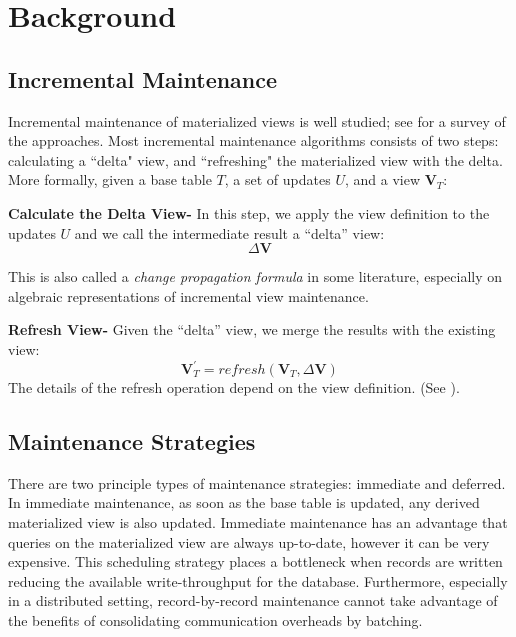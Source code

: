 \section{Background}\label{sec-background}

\subsection{Incremental Maintenance}
Incremental maintenance of materialized views is well studied; see \cite{chirkova2011materialized} for a survey of the approaches. 
Most incremental maintenance algorithms consists of two steps: calculating a ``delta" view,
and ``refreshing" the materialized view with the delta.
More formally, given a base table $T$, a set of updates $U$,
and a view $\textbf{V}_{T}$:

\textbf{Calculate the Delta View- }
In this step, we apply the view definition to the updates $U$ and we call
the intermediate result a ``delta'' view:
\[
\Delta\textbf{V}
\]

This is also called a \emph{change propagation formula} in some literature, 
especially on algebraic representations of incremental view maintenance.

\textbf{Refresh View- }
Given the ``delta'' view, we merge the results with the existing
view:
\[
\textbf{V}_{T}^{'}=refresh(\textbf{V}_{T},\Delta\textbf{V})
\] 
The details of the refresh operation depend on the view definition.
(See \cite{chirkova2011materialized}).


\subsection{Maintenance Strategies}
There are two principle types of maintenance strategies: immediate and deferred. 
In immediate maintenance, as soon as the base table is updated, 
any derived materialized view is also updated.
Immediate maintenance has an advantage that queries on the materialized view are always up-to-date, 
however it can be very expensive.
This scheduling strategy places a bottleneck when records are written reducing 
the available write-throughput for the database. 
Furthermore, especially in a distributed setting, record-by-record 
maintenance cannot take advantage of the benefits of consolidating communication overheads by batching.

